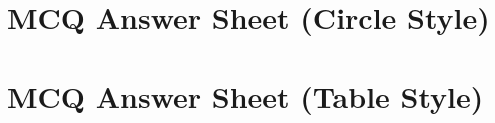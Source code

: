 \documentclass[a4paper,14pt,oneside]{hcmusexam}
\begin{document}
\section*{MCQ Answer Sheet (Circle Style)}

\vspace{0.5cm}

\section*{MCQ Answer Sheet (Table Style)}

\vfill
{}
\end{document}
